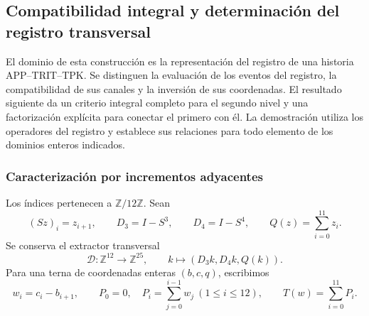\subsection{Compatibilidad integral y determinación del registro transversal}
\label{img09:seccion}

El dominio de esta construcción es la representación del registro de una
historia APP--TRIT--TPK. Se distinguen la evaluación de los eventos del
registro, la compatibilidad de sus canales y la inversión de sus
coordenadas. El resultado siguiente da un criterio integral completo para
el segundo nivel y una factorización explícita para conectar el primero con él.
La demostración utiliza los operadores del registro y establece sus
relaciones para todo elemento de los dominios enteros indicados.

\subsubsection{Caracterización por incrementos adyacentes}

Los índices pertenecen a $\mathbb Z/12\mathbb Z$. Sean
\[
 (Sz)_i=z_{i+1},\qquad D_3=I-S^3,\qquad D_4=I-S^4,
 \qquad Q(z)=\sum_{i=0}^{11}z_i.
\]
Se conserva el extractor transversal
\[
 \mathcal D:\mathbb Z^{12}\longrightarrow\mathbb Z^{25},
 \qquad k\longmapsto(D_3k,D_4k,Q(k)).
\]
Para una terna de coordenadas enteras $(b,c,q)$, escribimos
\begin{equation}
 w_i=c_i-b_{i+1},\qquad
 P_0=0,\quad P_i=\sum_{j=0}^{i-1}w_j\ (1\leq i\leq12),
 \qquad T(w)=\sum_{i=0}^{11}P_i.
 \label{img09:incremento}
\end{equation}

